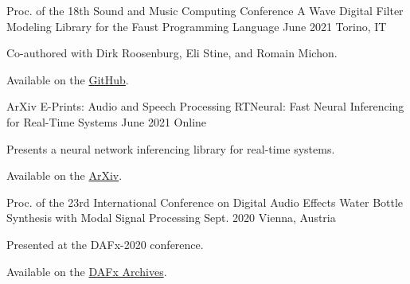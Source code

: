 

\begin{cventries}

  \cventry
    {Proc. of the 18th Sound and Music Computing Conference} %
    {A Wave Digital Filter Modeling Library for the Faust Programming Language} %
    {June 2021} %
    {Torino, IT} %
    {
      \begin{cvitems} %
        \item {Co-authored with Dirk Roosenburg, Eli Stine, and Romain Michon.}
        \item {Available on the \href{https://github.com/droosenb/faust-wdf-library/blob/main/SMC-2021-paper/a-wave-digital-filter-modeling-library-for-faust.pdf}{GitHub}.}
      \end{cvitems}
    }

  \cventry
    {ArXiv E-Prints: Audio and Speech Processing} %
    {RTNeural: Fast Neural Inferencing for Real-Time Systems} %
    {June 2021} %
    {Online} %
    {
      \begin{cvitems} %
        \item {Presents a neural network inferencing library for real-time systems.}
        \item {Available on the \href{https://arxiv.org/pdf/2106.03037.pdf}{ArXiv}.}
      \end{cvitems}
    }

  \cventry
    {Proc. of the 23rd International Conference on Digital Audio Effects} %
    {Water Bottle Synthesis with Modal Signal Processing} %
    {Sept. 2020} %
    {Vienna, Austria} %
    {
      \begin{cvitems} %
        \item {Presented at the DAFx-2020 conference.}
        \item {Available on the \href{https://www.dafx.de/paper-archive/2020/proceedings/papers/DAFx2020_paper_24.pdf}{DAFx Archives}.}
      \end{cvitems}
    }


\end{cventries}
